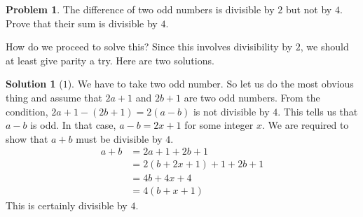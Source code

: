 \documentclass[a4paper, leqno]{article}
\theoremstyle{definition}
\newtheorem{problem}{Problem}
\newtheorem*{solution}{Solution}
\theoremstyle{remark}
\begin{document}
		\begin{problem}
			The difference of two odd numbers is divisible by $2$ but not by $4$. Prove
			that their sum is divisible by $4$.
		\end{problem}
	How do we proceed to solve this? Since this involves divisibility by $2$, we should at least give parity a try. Here are two solutions.
		\begin{solution}[$1$]
			We have to take two odd number. So let us do the most obvious thing and assume that $2a+1$ and $2b+1$ are two odd numbers. From the condition, $2a+1-(2b+1)=2(a-b)$ is not divisible by $4$. This tells us that $a-b$ is odd. In that case, $a-b=2x+1$ for some integer $x$. We are required to show that $a+b$ must be divisible by $4$.
				\begin{align*}
					a+b & =2a+1+2b+1\\
						& = 2(b+2x+1)+1+2b+1\\
						& = 4b+4x+4\\
						& = 4(b+x+1)
				\end{align*}
			This is certainly divisible by $4$.
		\end{solution}
	
\end{document}
